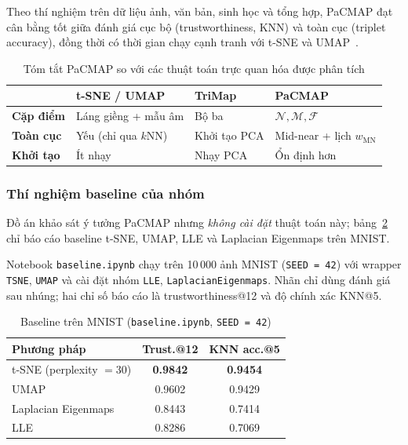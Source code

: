 Theo thí nghiệm trên dữ liệu ảnh, văn bản, sinh học và tổng hợp, PaCMAP đạt cân bằng tốt giữa đánh giá cục bộ (trustworthiness, KNN) và toàn cục (triplet accuracy), đồng thời có thời gian chạy cạnh tranh với t-SNE và UMAP~\cite{wang2021pacmap}.

\begin{table}[H]
\centering
\caption{Tóm tắt PaCMAP so với các thuật toán trực quan hóa được phân tích}
\label{tab:pacmap-compare}
\begin{tabular}{@{}llll@{}}
\toprule
 & \textbf{t-SNE / UMAP} & \textbf{TriMap} & \textbf{PaCMAP} \\
\midrule
\textbf{Cặp điểm} & Láng giềng + mẫu âm & Bộ ba & $\mathcal{N}, \mathcal{M}, \mathcal{F}$ \\
\textbf{Toàn cục} & Yếu (chỉ qua $k$NN) & Khởi tạo PCA & Mid-near + lịch $w_{\text{MN}}$ \\
\textbf{Khởi tạo} & Ít nhạy & Nhạy PCA & Ổn định hơn \\
\bottomrule
\end{tabular}
\end{table}

\subsubsection{Thí nghiệm baseline của nhóm}
\label{sec:pacmap-implementation}

\begin{extension}
Đồ án khảo sát ý tưởng PaCMAP nhưng \emph{không cài đặt} thuật toán này; bảng~\ref{tab:bonus-tsne-umap} chỉ báo cáo baseline t-SNE, UMAP, LLE và Laplacian Eigenmaps trên MNIST.
\end{extension}

Notebook \texttt{baseline.ipynb} chạy trên 10\,000 ảnh MNIST (\texttt{SEED = 42}) với wrapper \texttt{TSNE}, \texttt{UMAP} và cài đặt nhóm \texttt{LLE}, \texttt{LaplacianEigenmaps}. Nhãn chỉ dùng đánh giá sau nhúng; hai chỉ số báo cáo là trustworthiness@12 và độ chính xác KNN@5.

\begin{table}[H]
\centering
\caption{Baseline trên MNIST (\texttt{baseline.ipynb}, \texttt{SEED = 42})}
\label{tab:bonus-tsne-umap}
\begin{tabular}{@{}lcc@{}}
\toprule
\textbf{Phương pháp} & \textbf{Trust.@12} & \textbf{KNN acc.@5} \\
\midrule
t-SNE (perplexity $= 30$) & \textbf{0.9842} & \textbf{0.9454} \\
UMAP                      & 0.9602          & 0.9429 \\
Laplacian Eigenmaps       & 0.8443          & 0.7414 \\
LLE                       & 0.8286          & 0.7069 \\
\bottomrule
\end{tabular}
\end{table}


